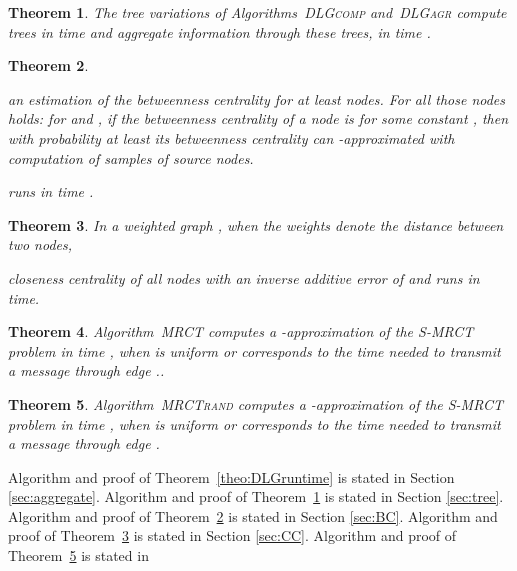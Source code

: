 \documentclass[11pt]{article}
\newtheorem{theorem}{Theorem}[section]
\newif\iffull
\newif\ifshort
\begin{document}
\begin{theorem}\label{theo:tree}
The tree variations of Algorithms\iffull~\ref{alg:DLGcomp}\fi~\textsc{DLGcomp} and\iffull~\ref{alg:DLGagr}\fi~\textsc{DLGagr} compute  trees  in time  and aggregate information through these  trees, in time .
\end{theorem}

\begin{theorem}\label{theo:bcapprox}
\ifshort
One can compute 
\fi
\iffull
Algorithm \ref{alg:BC_setup_controlling} computes 
\fi
an estimation of the betweenness centrality for at least  nodes. For all those nodes holds: for  and , if the betweenness centrality of a node  is  for some constant , then with probability at least  its betweenness centrality can  -approximated with computation of  samples of source nodes. 
\ifshort
This algorithm 
\fi
\iffull
Algorithm \ref{alg:BC_setup_controlling} 
\fi
 runs in time .
\end{theorem}

\begin{theorem}\label{theo:ccapprox}
In a weighted graph , when the weights  denote the distance between two nodes, 
\ifshort
one can approximate 
\fi
\iffull
Algorithm \ref{alg:CC} approximates 
\fi
closeness centrality of all nodes with an inverse additive error of  and runs in  time.
\end{theorem}

\begin{theorem}
Algorithm\iffull~\ref{alg:MRCT}\fi~\textsc{MRCT} computes a -approximation of the S-MRCT problem in time , when  is uniform or corresponds to the time needed to transmit a message through edge ..
\label{theo:mrctapprox}
\end{theorem}
\begin{theorem}\label{theo:mrctapprox-rand}
Algorithm~\textsc{MRCTrand} computes a -approximation of the S-MRCT problem in time , when  is uniform or corresponds to the time needed to transmit a message through edge .
\end{theorem}
Algorithm and proof of Theorem~\ref{theo:DLGruntime} is stated in Section \ref{sec:aggregate}.
Algorithm and proof of Theorem~\ref{theo:tree} is stated in Section \ref{sec:tree}.
Algorithm and proof of Theorem~\ref{theo:bcapprox} is stated in Section \ref{sec:BC}.
Algorithm and proof of Theorem~\ref{theo:ccapprox} is stated in Section \ref{sec:CC}.
Algorithm and proof of Theorem~\ref{theo:mrctapprox-rand} is stated in
\ifshort
Appendix \ref{FULL:app:MRCT}.
\fi
\iffull
Section \ref{app:MRCT}.
\fi
\end{document}
